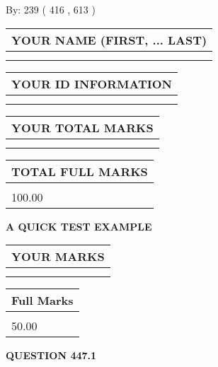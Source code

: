 \documentclass[12pt]{article}
\begin{document}
   
\hspace{1.0in} By: 
 239 ( 416 ,  613 )
   
   
   
   
\newpage 
\setcounter{page}{ 
   447001 } 
   
   
   
   
\noindent\begin{tabular}{|l|}
\hline
YOUR NAME (FIRST, ... LAST)  \\
\hline
 \\ 
 \\ 
\hline
\end{tabular}
\hspace{0.05in} \begin{tabular}{|l|}
\hline
 YOUR   ID   INFORMATION  \\
\hline
 \\ 
 \\ 
\hline
\end{tabular}
   
   
\vspace{0.2in}\noindent\begin{tabular}{|l|}
\hline
YOUR TOTAL MARKS  \\
\hline
 \\ 
 \\ 
\hline
\end{tabular}
\hspace{0.05in} \begin{tabular}{|l|}
\hline
TOTAL FULL MARKS  \\
\hline
 \\ 
100.00 \\
\hline
\end{tabular}
   
   
 \vspace{0.2in}
{\LARGE {\textbf{ A QUICK TEST EXAMPLE}}}
   
   
  
\vspace{0.2in}
  
\noindent\begin{tabular}{|l|}
\hline
 YOUR MARKS  \\
\hline
 \\ 
 \\ 
\hline
\end{tabular}
\hspace{0.05in} \begin{tabular}{|l|}
\hline
 Full Marks  \\
\hline
 \\ 
50.00 \\
\hline
\end{tabular}
{\textbf{\Large{QUESTION
447.1 
}}}
  
\end{document}
